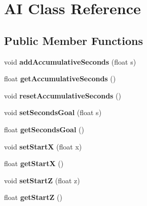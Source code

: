 \hypertarget{class_a_i}{\section{A\-I Class Reference}
\label{class_a_i}
}
\subsection*{Public Member Functions}
\begin{DoxyCompactItemize}
\item 
\hypertarget{class_a_i_a47fb2523348a4cd6ec576756ff1b2f38}{void {\bfseries add\-Accumulative\-Seconds} (float s)}\label{class_a_i_a47fb2523348a4cd6ec576756ff1b2f38}

\item 
\hypertarget{class_a_i_a5d46c42dc0f98fda1d44cf457c6a624a}{float {\bfseries get\-Accumulative\-Seconds} ()}\label{class_a_i_a5d46c42dc0f98fda1d44cf457c6a624a}

\item 
\hypertarget{class_a_i_a7db715f4894549d4c5c460122597094a}{void {\bfseries reset\-Accumulative\-Seconds} ()}\label{class_a_i_a7db715f4894549d4c5c460122597094a}

\item 
\hypertarget{class_a_i_a1b79156d9f700bd67c0ce3ab878fd6e2}{void {\bfseries set\-Seconds\-Goal} (float s)}\label{class_a_i_a1b79156d9f700bd67c0ce3ab878fd6e2}

\item 
\hypertarget{class_a_i_aaf72813887cdda5ddf97630d7038fc2d}{float {\bfseries get\-Seconds\-Goal} ()}\label{class_a_i_aaf72813887cdda5ddf97630d7038fc2d}

\item 
\hypertarget{class_a_i_aaf27440d65892f0c6ca0929c5781d049}{void {\bfseries set\-Start\-X} (float x)}\label{class_a_i_aaf27440d65892f0c6ca0929c5781d049}

\item 
\hypertarget{class_a_i_a57499b273818bda86dab270cf8d0801c}{float {\bfseries get\-Start\-X} ()}\label{class_a_i_a57499b273818bda86dab270cf8d0801c}

\item 
\hypertarget{class_a_i_a239f6ba1e745271696647a5544eb177d}{void {\bfseries set\-Start\-Z} (float z)}\label{class_a_i_a239f6ba1e745271696647a5544eb177d}

\item 
\hypertarget{class_a_i_aee79ebdd25c297b2d9ca571902b61f0c}{float {\bfseries get\-Start\-Z} ()}\label{class_a_i_aee79ebdd25c297b2d9ca571902b61f0c}


\end{DoxyCompactItemize}
